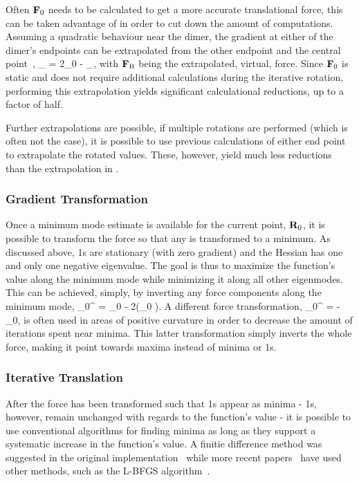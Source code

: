 Often ${\mathrm{\mathbf{\bm{F}}}}_0$ needs to be calculated to get a more accurate translational force, this can be taken advantage of in order to cut down the amount of computations.
Assuming a quadratic behaviour near the dimer, the gradient at either of the dimer's endpoints can be extrapolated from the other endpoint and the central point~\cite{dimer-olsen-2004},
\vF_ = 2\vF_0 - \vF_,
\eeq
with ${\mathrm{\mathbf{\bm{F}}}}_\text{B}$ being the extrapolated, virtual, force.
Since ${\mathrm{\mathbf{\bm{F}}}}_0$ is static and does not require additional calculations during the iterative rotation, performing this extrapolation yields significant calculational reductions, up to a factor of half.

Further extrapolations are possible, if multiple rotations are performed (which is often not the case), it is possible to use previous calculations of either end point to extrapolate the rotated values.
These, however, yield much less reductions than the extrapolation in .

\recent

\subsubsection{Gradient Transformation}
Once a minimum mode estimate is available for the current point, ${\mathrm{\mathbf{\bm{R}}}}_0$, it is possible to transform the force so that any  is transformed to a minimum.
As discussed above, \sap1s are stationary (with zero gradient) and the Hessian has one and only one negative eigenvalue.
The goal is thus to maximize the function's value along the minimum mode while minimizing it along all other eigenmodes.
This can be achieved, simply, by inverting any force components along the minimum mode,
\vF_0^ = \vF_0 - 2(\vF_0 \cdot \uvn)\uvn.
\eeq
A different force transformation,
\vF_0^ = -\vF_0,
\eeq
is often used in areas of positive curvature in order to decrease the amount of iterations spent near minima.
This latter transformation simply inverts the whole force, making it point towards maxima instead of minima or \sap1s.

\recent

\subsubsection{Iterative Translation}
After the force has been transformed such that \sap1s appear as minima - \sap1s, however, remain unchanged with regards to the function's value - it is possible to use conventional algorithms for finding minima as long as they support a systematic increase in the function's value.
A finitie difference method was suggested in the original implementation~\cite{dimer-original-1999} while more recent papers~\cite{dimer-kastner-2008} have used other methods, such as the L-BFGS algorithm~\cite{lbfgs}.

\recent

